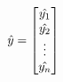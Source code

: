 \documentclass[preview]{standalone}
\begin{document}
\begin{align*}
\special{dvisvgm:raw <g id='unique000'>}\hat{y}=\begin{bmatrix}\hat{y_1}\\\hat{y_2}\\\vdots\\\hat{y_n}\end{bmatrix}\special{dvisvgm:raw </g>}
\end{align*}
\end{document}
